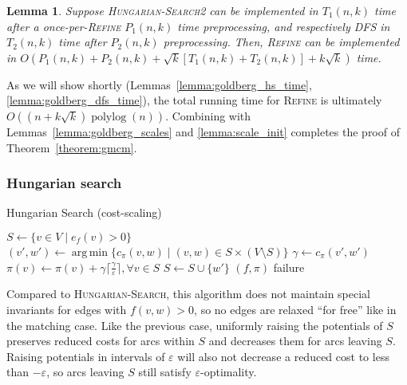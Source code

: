 \documentclass[11pt]{article}
\def\polylog{\mathop{\mathrm{polylog}}}
\def\eps{\varepsilon}
\DeclareMathOperator*{\argmin}{arg\,min}
\theoremstyle{plain}
\newtheorem{lemma}{Lemma}
\begin{document}
\begin{lemma}
	Suppose \textsc{Hungarian-Search2} can be implemented in $T_1(n, k)$ 
	time after a once-per-\textsc{Refine} $P_1(n, k)$ time preprocessing,
	and respectively \textsc{DFS} in $T_2(n, k)$ time after $P_2(n, k)$ 
	preprocessing.
	Then, \textsc{Refine} can be implemented in 
	$O(P_1(n, k) + P_2(n, k) + \sqrt{k}[T_1(n, k) + T_2(n, k)] + k\sqrt{k})$ 
	time.
\end{lemma}

As we will show shortly (Lemmas~\ref{lemma:goldberg_hs_time}, 
\ref{lemma:goldberg_dfs_time}), the total running time for \textsc{Refine}
is ultimately $O((n + k\sqrt{k})\polylog(n))$.
Combining with Lemmas~\ref{lemma:goldberg_scales} and \ref{lemma:scale_init}
completes the proof of Theorem~\ref{theorem:gmcm}.

\subsubsection{Hungarian search}

\begin{algorithm}
\caption{Hungarian Search (cost-scaling)}
\begin{algorithmic}[1]
	\State $S \gets \{v \in V \mid e_f(v) > 0\}$
	\Repeat
		\State $(v', w') \gets \argmin\{c_\pi(v, w) \mid (v, w) \in S \times (V \setminus S)\}$
		\State $\gamma \gets c_\pi(v', w')$
			\State $\pi(v) \gets \pi(v) + \gamma\lceil\frac{\gamma}{\eps}\rceil, \forall v \in S$
		\EndIf
		\State $S \gets S \cup \{w'\}$
		\Statex %
		 
			\State\Return $(f, \pi)$
		\EndIf
	\State\Return failure
\EndFunction
\end{algorithmic}
\end{algorithm}

Compared to \textsc{Hungarian-Search}, this algorithm does not maintain special
invariants for edges with $f(v, w) > 0$, so no edges are relaxed ``for free''
like in the matching case.
Like the previous case, uniformly raising the potentials of $S$ preserves 
reduced costs for arcs within $S$ and decreases them for arcs leaving $S$.
Raising potentials in intervals of $\eps$ will also not decrease a reduced
cost to less than $-\eps$, so arcs leaving $S$ still satisfy $\eps$-optimality.
\end{document}
